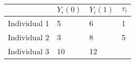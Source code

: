 \documentclass[]{article}
\begin{document}
\begin{longtable}[]{@{}llll@{}}
\toprule
\begin{minipage}[b]{0.20\columnwidth}\raggedright\strut
\strut
\end{minipage} & \begin{minipage}[b]{0.16\columnwidth}\raggedright\strut
\(Y_{i}(0)\)\strut
\end{minipage} & \begin{minipage}[b]{0.16\columnwidth}\raggedright\strut
\(Y_{i}(1)\)\strut
\end{minipage} & \begin{minipage}[b]{0.16\columnwidth}\raggedright\strut
\(\tau_i\)\strut
\end{minipage}\tabularnewline
\midrule
\endhead
\begin{minipage}[t]{0.20\columnwidth}\raggedright\strut
Individual 1\strut
\end{minipage} & \begin{minipage}[t]{0.16\columnwidth}\raggedright\strut
5\strut
\end{minipage} & \begin{minipage}[t]{0.16\columnwidth}\raggedright\strut
6\strut
\end{minipage} & \begin{minipage}[t]{0.16\columnwidth}\raggedright\strut
1\strut
\end{minipage}\tabularnewline
\begin{minipage}[t]{0.20\columnwidth}\raggedright\strut
Individual 2\strut
\end{minipage} & \begin{minipage}[t]{0.16\columnwidth}\raggedright\strut
3\strut
\end{minipage} & \begin{minipage}[t]{0.16\columnwidth}\raggedright\strut
8\strut
\end{minipage} & \begin{minipage}[t]{0.16\columnwidth}\raggedright\strut
5\strut
\end{minipage}\tabularnewline
\begin{minipage}[t]{0.20\columnwidth}\raggedright\strut
Individual 3\strut
\end{minipage} & \begin{minipage}[t]{0.16\columnwidth}\raggedright\strut
10\strut
\end{minipage} & \begin{minipage}[t]{0.16\columnwidth}\raggedright\strut
12\strut
\end{minipage} & \begin{minipage}[t]{0.16\columnwidth}\raggedright\strut

\end{minipage}
\end{longtable}
\end{document}
